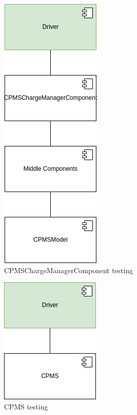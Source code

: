 \begin{figure}[H]
    \centering
    \includegraphics[keepaspectratio]{Testing/CPMS/cpms-CPMSChargeManagerComponent.drawio.png}
    \caption{\ac{CPMS}ChargeManagerComponent testing}
\end{figure}
\begin{figure}[H]
    \centering
    \includegraphics[keepaspectratio]{Testing/CPMS/cpms-CPMS.drawio.png}
    \caption{\ac{CPMS} testing}
\end{figure}

\clearpage